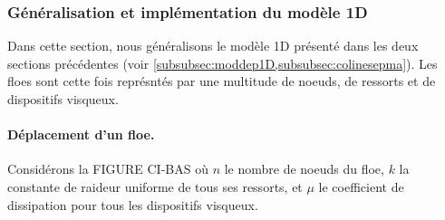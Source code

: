 









\subsubsection{Généralisation et implémentation du modèle 1D}

Dans cette section, nous généralisons le modèle 1D présenté dans les deux sections précédentes (voir \cref{subsubsec:moddep1D,subsubsec:colinesepma}). Les floes sont cette fois représntés par une multitude de noeuds, de ressorts et de dispositifs visqueux. 

\paragraph{Déplacement d'un floe.} Considérons la FIGURE CI-BAS où $n$ le nombre de noeuds du floe, $k$ la constante de raideur uniforme de tous ses ressorts, et $\mu$ le coefficient de dissipation pour tous les dispositifs visqueux. 

